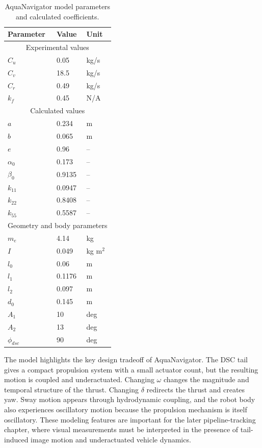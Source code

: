 \documentclass{uhcoethesis}
\begin{document}
\begin{table}[t]
    \centering
    \caption{AquaNavigator model parameters and calculated coefficients.}
    \label{tab:ch2_fish_model_parameters}
    \begin{tabular}{lll}
        \hline
        Parameter & Value & Unit \\
        \hline
        \multicolumn{3}{c}{Experimental values} \\
        \hline
        $C_u$ & 0.05 & kg/s \\
        $C_v$ & 18.5 & kg/s \\
        $C_r$ & 0.49 & kg/s \\
        $k_f$ & 0.45 & N/A \\
        \hline
        \multicolumn{3}{c}{Calculated values} \\
        \hline
        $a$ & 0.234 & m \\
        $b$ & 0.065 & m \\
        $e$ & 0.96 & -- \\
        $\alpha_0$ & 0.173 & -- \\
        $\beta_0$ & 0.9135 & -- \\
        $k_{11}$ & 0.0947 & -- \\
        $k_{22}$ & 0.8408 & -- \\
        $k_{55}$ & 0.5587 & -- \\
        \hline
        \multicolumn{3}{c}{Geometry and body parameters} \\
        \hline
        $m_e$ & 4.14 & kg \\
        $I$ & 0.049 & kg m$^2$ \\
        $l_0$ & 0.06 & m \\
        $l_1$ & 0.1176 & m \\
        $l_2$ & 0.097 & m \\
        $d_0$ & 0.145 & m \\
        $A_1$ & 10 & deg \\
        $A_2$ & 13 & deg \\
        $\phi_{dsc}$ & 90 & deg \\
        \hline
    \end{tabular}
\end{table}

The model highlights the key design tradeoff of AquaNavigator. The DSC tail gives a compact propulsion system with a small actuator count, but the resulting motion is coupled and underactuated. Changing $\omega$ changes the magnitude and temporal structure of the thrust. Changing $\delta$ redirects the thrust and creates yaw. Sway motion appears through hydrodynamic coupling, and the robot body also experiences oscillatory motion because the propulsion mechanism is itself oscillatory. These modeling features are important for the later pipeline-tracking chapter, where visual measurements must be interpreted in the presence of tail-induced image motion and underactuated vehicle dynamics.
\end{document}
